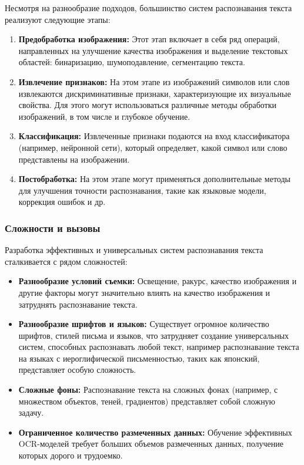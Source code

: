 Несмотря  на  разнообразие  подходов,  большинство  систем  распознавания  текста  реализуют  следующие  этапы:

\begin{enumerate}
    \item \textbf{Предобработка изображения:}  Этот  этап  включает  в  себя  ряд  операций,  направленных  на  улучшение  качества  изображения  и  выделение  текстовых  областей:  бинаризацию,  шумоподавление,  сегментацию  текста.
    \item \textbf{Извлечение признаков:}  На  этом  этапе  из  изображений  символов  или  слов  извлекаются  дискриминативные  признаки,  характеризующие  их  визуальные  свойства.  Для  этого  могут  использоваться  различные  методы  обработки  изображений,  в  том  числе  и  глубокое  обучение. 
    \item \textbf{Классификация:}  Извлеченные  признаки  подаются  на  вход  классификатора  (например,  нейронной  сети),  который  определяет,  какой  символ  или  слово  представлены  на  изображении. 
    \item \textbf{Постобработка:}  На  этом  этапе  могут  применяться  дополнительные  методы  для  улучшения  точности  распознавания,  такие  как  языковые  модели,  коррекция  ошибок  и  др. 
\end{enumerate}

\subsubsection{Сложности и вызовы}

Разработка  эффективных  и  универсальных  систем  распознавания  текста  сталкивается  с  рядом  сложностей:

\begin{itemize}
    \item \textbf{Разнообразие  условий  съемки:}  Освещение,  ракурс,  качество  изображения  и  другие  факторы  могут  значительно  влиять  на  качество  изображения  и  затруднять  распознавание  текста. 
    \item \textbf{Разнообразие  шрифтов  и  языков:}  Существует  огромное  количество  шрифтов,  стилей  письма  и  языков,  что  затрудняет  создание  универсальных  систем,  способных  распознавать  любой  текст, например распознавание  текста на  языках  с  иероглифической  письменностью,  таких как  японский,  представляет  особую  сложность. 
    \item \textbf{Сложные  фоны:}  Распознавание  текста  на  сложных  фонах  (например,  с  множеством  объектов,  теней,  градиентов)  представляет  собой  сложную  задачу.
    \item \textbf{Ограниченное количество размеченных данных:}  Обучение  эффективных  OCR-моделей требует  больших объемов размеченных данных,  получение которых  дорого  и трудоемко. 
\end{itemize}


